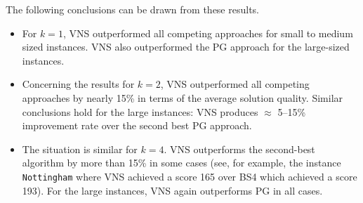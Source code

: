 \documentclass[dvipsnames,format=sigconf,anonymous=true,review=true]{acmart}
\begin{document}
The following conclusions can be drawn from these results. 
   
\begin{itemize}
  		\item  For $k=1$, VNS outperformed all competing approaches for small to medium sized instances. VNS also outperformed the PG approach for the large-sized instances.  
  		\item Concerning the results for $k=2$, VNS outperformed all competing approaches by nearly 15\% in terms of the average solution quality. Similar conclusions hold for the large instances: VNS produces $\approx$ 5--15\% improvement rate over the second best PG approach. 
  		\item The situation is similar for $k=4$. VNS outperforms the second-best algorithm by more than 15\% in some cases (see, for example,  the instance \texttt{Nottingham} where VNS achieved a score 165 over BS4 which achieved a score 193). For the large instances, VNS again outperforms PG in all cases. 
  		
\end{itemize}
 
\end{document}

